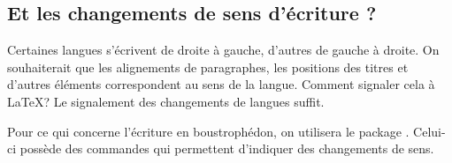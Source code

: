 \subsection{Et les changements de sens d'écriture ?}

Certaines langues s'écrivent de droite à gauche, d'autres de gauche à droite. On souhaiterait que les alignements de paragraphes, les positions des titres et d'autres éléments correspondent au sens de la langue. 
Comment signaler cela à \LaTeX ? Le signalement des changements de langues suffit. 

\begin{plusloins}
Pour ce qui concerne l'écriture en boustrophédon, on utilisera le package . Celui-ci possède des  commandes qui permettent d'indiquer des changements de sens. 
\end{plusloins}

